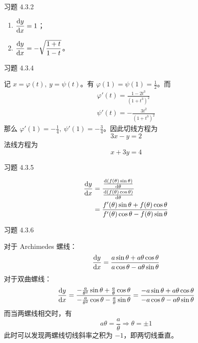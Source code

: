 \begin{problem}
	习题 4.3.2

	\begin{solution}
		\begin{enumerate}
			\item[\textbf{2)}] $\displaystyle \dv{y}{x} = 1$；
			\item[\textbf{4)}] $\displaystyle \dv{y}{x} = -\sqrt{\frac{1 + t}{1 - t}}$。
		\end{enumerate}
	\end{solution}
\end{problem}

\begin{problem}
	习题 4.3.4
	
	\begin{solution}
		记 $x = \varphi(t),\ y = \psi(t)$。有 $\varphi(1) = \psi(1) = \frac{1}{2}$。而
		$$
		\begin{gathered}
			\varphi'(t) = \frac{1 - 2t^3}{(1 + t^3)^2} \\
			\psi'(t) = -\frac{3t^2}{(1 + t^3)^2}
		\end{gathered}
		$$
		那么 $\varphi'(1) = -\frac{1}{4},\ \psi'(1) = -\frac{3}{4}$。因此切线方程为
		$$
		3x - y = 2
		$$
		法线方程为
		$$
		x + 3y = 4
		$$
	\end{solution}
\end{problem}

\begin{problem}
	习题 4.3.5

	\begin{solution}
		$$
		\begin{aligned}
			\dv{y}{x} & = \frac{\frac{\dd(f(\theta) \sin \theta)}{\dd \theta}}{\frac{\dd(f(\theta) \cos \theta)}{\dd \theta}} \\
			& = \frac{f'(\theta) \sin \theta + f(\theta) \cos \theta}{f'(\theta) \cos \theta - f(\theta) \sin \theta}
		\end{aligned}
		$$
	\end{solution}
\end{problem}

\begin{problem}
	习题 4.3.6

	\begin{solution}
		对于 Archimedes 螺线：
		$$
		\dv{y}{x} = \frac{a \sin \theta + a \theta \cos \theta}{a \cos \theta - a \theta \sin \theta}
		$$
		对于双曲螺线：
		$$
		\dv{y}{x} = \frac{-\frac{a}{\theta^2} \sin \theta + \frac{a}{\theta} \cos \theta}{-\frac{a}{\theta^2} \cos \theta - \frac{a}{\theta} \sin \theta} = \frac{-a \sin \theta + a \theta \cos \theta}{-a \cos \theta - a \theta \sin \theta}
		$$
		而当两螺线相交时，有
		$$
		a \theta = \frac{a}{\theta} \Rightarrow \theta = \pm 1
		$$
		此时可以发现两螺线切线斜率之积为 $-1$，即两切线垂直。
	\end{solution}
\end{problem}
